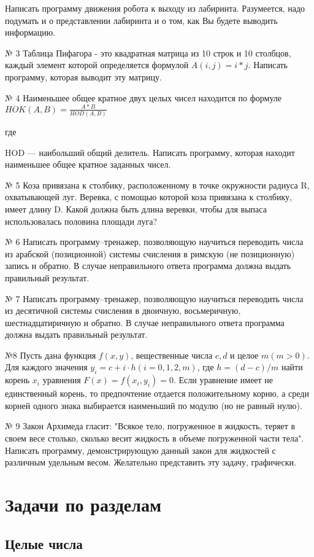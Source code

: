 Написать программу движения робота к выходу из лабиринта. Разумеется, надо подумать и о представлении лабиринта и о том, как Вы будете выводить информацию.

№ 3 Таблица Пифагора - это квадратная матрица из 10 строк и 10 столбцов, каждый элемент которой определяется формулой $A(i, j) = i*j.$ Написать программу, которая выводит эту матрицу.

№ 4 Наименьшее общее кратное двух целых чисел находится по формуле 
$HOK(A,B)=\frac{A*B}{HOD(A,B)}$

где {HOD --- наибольший общий делитель. Написать программу, которая находит наименьшее общее кратное заданных чисел.

№ 5 Коза привязана к столбику, расположенному в точке окружности радиуса R, охватывающей луг. Веревка, с помощью которой коза привязана к столбику, имеет длину D. Какой должна быть длина веревки, чтобы для выпаса использовалась половина площади луга?

№ 6 Написать программу--тренажер, позволяющую научиться переводить числа из арабской (позиционной) системы счисления в римскую (не позиционную) запись и обратно. В случае неправильного ответа программа должна выдать правильный результат.

№ 7 Написать программу--тренажер, позволяющую научиться переводить числа из десятичной системы счисления в двоичную, восьмеричную, шестнадцатиричную и обратно. В случае неправильного ответа программа должна выдать правильный результат.

№8 Пусть дана функция $f(x,y)$, вещественные числа $c, d$ и целое $m (m>0)$. Для каждого значения $y_i = c + i\cdot h (i= 0,1,2, m)$, где $h = (d-c)/m$ найти корень $x_i$ уравнения $F(x) = f(x_i, y_i) = 0$. Если уравнение имеет не единственный корень, то предпочтение отдается положительному корню, а среди корней одного знака выбирается наименьший по модулю (но не равный нулю).

№ 9 Закон Архимеда гласит: "Всякое тело, погруженное в жидкость, теряет в своем весе столько, сколько весит жидкость в объеме погруженной части тела". Написать программу, демонстрирующую данный закон для жидкостей с различным удельным весом. Желательно представить эту задачу, графически.

\section{Задачи по разделам}

\subsection{Целые числа}

}
